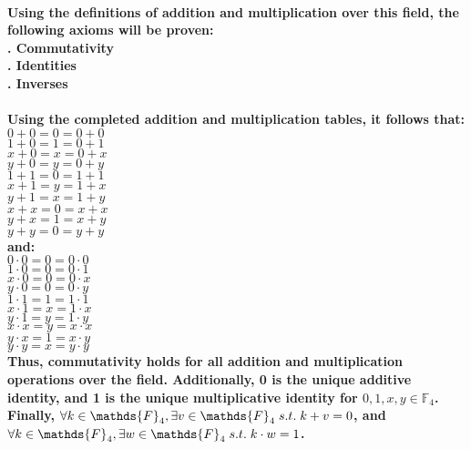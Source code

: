 \documentclass{article}
\begin{document}
\paragraph{\large
Using the definitions of addition and multiplication over this field, the following axioms will be proven:
\\. Commutativity
\\. Identities
\\. Inverses}

\paragraph{\large
Using the completed addition and multiplication tables, it follows that:
\\\indent \(0 + 0 = 0 = 0 + 0\)
\\\indent \(1 + 0 = 1 = 0 + 1\)
\\\indent \(x + 0 = x = 0 + x\)
\\\indent \(y + 0 = y = 0 + y\)
\\\indent \(1 + 1 = 0 = 1 + 1\)
\\\indent \(x + 1 = y = 1 + x\)
\\\indent \(y + 1 = x = 1 + y\)
\\\indent \(x + x = 0 = x + x\)
\\\indent \(y + x = 1 = x + y\)
\\\indent \(y + y = 0 = y + y\)
\\and:
\\\indent \(0 \cdot 0 = 0 = 0 \cdot 0\)
\\\indent \(1 \cdot 0 = 0 = 0 \cdot 1\)
\\\indent \(x \cdot 0 = 0 = 0 \cdot x\)
\\\indent \(y \cdot 0 = 0 = 0 \cdot y\)
\\\indent \(1 \cdot 1 = 1 = 1 \cdot 1\)
\\\indent \(x \cdot 1 = x = 1 \cdot x\)
\\\indent \(y \cdot 1 = y = 1 \cdot y\)
\\\indent \(x \cdot x = y = x \cdot x\)
\\\indent \(y \cdot x = 1 = x \cdot y\)
\\\indent \(y \cdot y = x = y \cdot y\)
\\Thus, commutativity holds for all addition and multiplication operations over the field. Additionally, 0 is the unique additive identity, and 1 is the unique multiplicative identity for \(0,1,x,y \in \mathds{F}_{4}\). Finally, \(\forall k \in \mathds{F}_{4}, \exists v \in \mathds{F}_{4} \thickspace s.t. \thickspace k + v = 0\), and \(\forall k \in \mathds{F}_{4}, \exists w \in \mathds{F}_{4} \thickspace s.t. \thickspace k \cdot w = 1\).}
\end{document}

